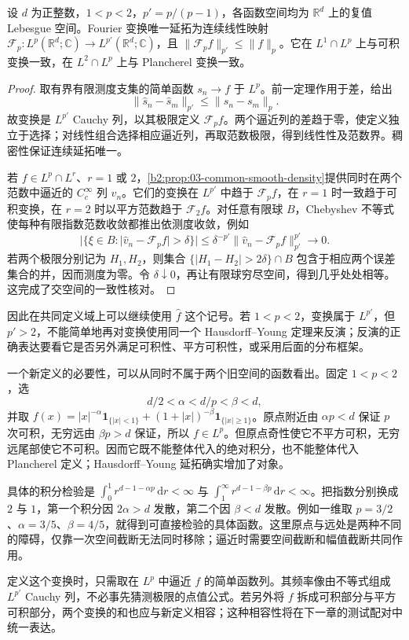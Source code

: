 \begin{corollary}\label{b2:cor:04-lp-extension}
设 \(d\) 为正整数，\(1<p<2\)，\(p'=p/(p-1)\)，各函数空间均为 \(\mathbb R^d\) 上的复值 Lebesgue 空间。Fourier 变换唯一延拓为连续线性映射 \(\mathcal F_p:L^p(\mathbb R^d;\mathbb C)\to L^{p'}(\mathbb R^d;\mathbb C)\)，且 \(\|\mathcal F_pf\|_{p'}\leq\|f\|_p\)。它在 \(L^1\cap L^p\) 上与可积变换一致，在 \(L^2\cap L^p\) 上与 Plancherel 变换一致。
\end{corollary}
\begin{proof}
取有界有限测度支集的简单函数 \(s_n\to f\) 于 \(L^p\)。前一定理作用于差，给出
\[
 \|\widehat s_n-\widehat s_m\|_{p'}\leq\|s_n-s_m\|_p.
\]
故变换是 \(L^{p'}\) Cauchy 列，以其极限定义 \(\mathcal F_pf\)。两个逼近列的差趋于零，使定义独立于选择；对线性组合选择相应逼近列，再取范数极限，得到线性性及范数界。稠密性保证连续延拓唯一。

若 \(f\in L^p\cap L^r\)、\(r=1\) 或 \(2\)，\cref{b2:prop:03-common-smooth-density}提供同时在两个范数中逼近的 \(C_c^\infty\) 列 \(v_n\)。它们的变换在 \(L^{p'}\) 中趋于 \(\mathcal F_pf\)，在 \(r=1\) 时一致趋于可积变换，在 \(r=2\) 时以平方范数趋于 \(\mathcal F_2f\)。对任意有限球 \(B\)，Chebyshev 不等式使每种有限指数范数收敛都推出依测度收敛，例如
\[
 |\{\xi\in B:|\widehat v_n-\mathcal F_pf|>\delta\}|
 \leq\delta^{-p'}\|\widehat v_n-\mathcal F_pf\|_{p'}^{p'}\longrightarrow0.
\]
若两个极限分别记为 \(H_1,H_2\)，则集合 \(\{|H_1-H_2|>2\delta\}\cap B\) 包含于相应两个误差集合的并，因而测度为零。令 \(\delta\downarrow0\)，再让有限球穷尽空间，得到几乎处处相等。这完成了交空间的一致性核对。
\end{proof}

因此在共同定义域上可以继续使用 \(\widehat f\) 这个记号。若 \(1<p<2\)，变换属于 \(L^{p'}\)，但 \(p'>2\)，不能简单地再对变换使用同一个 Hausdorff--Young 定理来反演；反演的正确表达要看它是否另外满足可积性、平方可积性，或采用后面的分布框架。



\ProseParagraphBreak

一个新定义的必要性，可以从同时不属于两个旧空间的函数看出。固定 \(1<p<2\)，选
\[
 d/2<\alpha<d/p<\beta<d,
\]
并取 \(f(x)=|x|^{-\alpha}\mathbf1_{\{|x|<1\}}+(1+|x|)^{-\beta}\mathbf1_{\{|x|\geq1\}}\)。原点附近由 \(\alpha p<d\) 保证 \(p\) 次可积，无穷远由 \(\beta p>d\) 保证，所以 \(f\in L^p\)。但原点奇性使它不平方可积，无穷远尾部使它不可积。因而它既不能整体代入的绝对积分，也不能整体代入 Plancherel 定义；Hausdorff--Young 延拓确实增加了对象。

\ProseParagraphBreak

具体的积分检验是 \(\int_0^1 r^{d-1-\alpha p}\,\mathrm{d}r<\infty\) 与 \(\int_1^\infty r^{d-1-\beta p}\,\mathrm{d}r<\infty\)。把指数分别换成 \(2\) 与 \(1\)，第一个积分因 \(2\alpha>d\) 发散，第二个因 \(\beta<d\) 发散。例如一维取 \(p=3/2\)、\(\alpha=3/5\)、\(\beta=4/5\)，就得到可直接检验的具体函数。这里原点与远处是两种不同的障碍，仅靠一次空间截断无法同时移除；逼近时需要空间截断和幅值截断共同作用。

\ProseParagraphBreak

定义这个变换时，只需取在 \(L^p\) 中逼近 \(f\) 的简单函数列。其频率像由不等式组成 \(L^{p'}\) Cauchy 列，不必事先猜测极限的点值公式。若另外将 \(f\) 拆成可积部分与平方可积部分，两个变换的和也应与新定义相容；这种相容性将在下一章的测试配对中统一表达。
